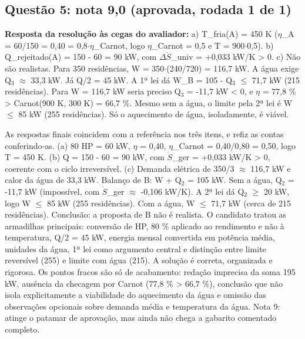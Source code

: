 \documentclass{article}%
\begin{document}
\subsection*{Questão 5: nota 9,0 (aprovada, rodada 1 de 1)}%
\textbf{Resposta da resolução às cegas do avaliador:} a) T\_fria(A) = 450 K ($\eta$\_A = 60/150 = 0,40 = 0,8$\cdot$$\eta$\_Carnot, logo $\eta$\_Carnot = 0,5 e T = 900$\cdot$0,5).\newline%
b) Q\_rejeitado(A) = 150 - 60 = 90 kW, com $\Delta$$\dot S$\_univ = +0,033 kW/K > 0.\newline%
c) Não são realistas. Para 350 residências, W = 350$\cdot$(240/720) = 116,7 kW. A água exige Q$_{3}$ $\approx$ 33,3 kW. Já Q/2 = 45 kW. A 1ª lei dá W\_B = 105 - Q$_{3}$ $\leq$ 71,7 kW (215 residências). Para W = 116,7 kW seria preciso Q$_{3}$ = -11,7 kW < 0, e $\eta$ = 77,8 \% > Carnot(900 K, 300 K) = 66,7 \%. Mesmo sem a água, o limite pela 2ª lei é W $\leq$ 85 kW (255 residências). Só o aquecimento de água, isoladamente, é viável.\par %
As respostas finais coincidem com a referência nos três itens, e refiz as contas conferindo{-}as. (a) 80 HP = 60 kW, $\eta$ = 0,40, $\eta$\_Carnot = 0,40/0,80 = 0,50, logo T = 450 K. (b) Q = 150 - 60 = 90 kW, com $\dot S$\_ger = +0,033 kW/K > 0, coerente com o ciclo irreversível. (c) Demanda elétrica de 350/3 $\approx$ 116,7 kW e calor da água de 33,3 kW. Balanço de B: W + Q$_{2}$ = 105 kW. Sem a água, Q$_{2}$ = -11,7 kW (impossível, com $\dot S$\_ger $\approx$ -0,106 kW/K). A 2ª lei dá Q$_{2}$ $\geq$ 20 kW, logo W $\leq$ 85 kW (255 residências). Com a água, W $\leq$ 71,7 kW (cerca de 215 residências). Conclusão: a proposta de B não é realista. O candidato tratou as armadilhas principais: conversão de HP, 80 \% aplicado ao rendimento e não à temperatura, Q/2 = 45 kW, energia mensal convertida em potência média, unidades da água, 1ª lei como argumento central e distinção entre limite reversível (255) e limite com água (215). A solução é correta, organizada e rigorosa. Os pontos fracos são só de acabamento: redação imprecisa da soma 195 kW, ausência da checagem por Carnot (77,8 \% > 66,7 \%), conclusão que não isola explicitamente a viabilidade do aquecimento da água e omissão das observações opcionais sobre demanda média e temperatura da água. Nota 9: atinge o patamar de aprovação, mas ainda não chega a gabarito comentado completo.%
\end{document}
